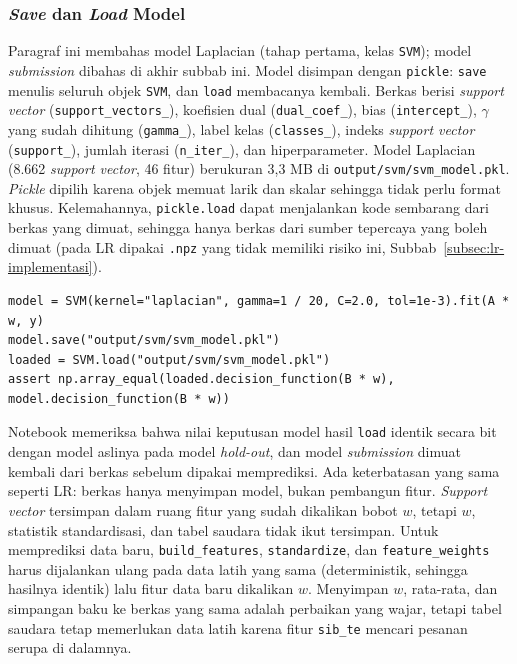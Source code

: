 \subsubsection{\textit{Save} dan \textit{Load} Model}
Paragraf ini membahas model Laplacian (tahap pertama, kelas \texttt{SVM}); model \textit{submission} dibahas di akhir subbab ini. Model disimpan dengan \texttt{pickle}: \texttt{save} menulis seluruh objek \texttt{SVM}, dan \texttt{load} membacanya kembali. Berkas berisi \textit{support vector} (\texttt{support\_vectors\_}), koefisien dual (\texttt{dual\_coef\_}), bias (\texttt{intercept\_}), $\gamma$ yang sudah dihitung (\texttt{gamma\_}), label kelas (\texttt{classes\_}), indeks \textit{support vector} (\texttt{support\_}), jumlah iterasi (\texttt{n\_iter\_}), dan hiperparameter. Model Laplacian (8.662 \textit{support vector}, 46 fitur) berukuran 3,3 MB di \nolinkurl{output/svm/svm_model.pkl}. \textit{Pickle} dipilih karena objek memuat larik dan skalar sehingga tidak perlu format khusus. Kelemahannya, \texttt{pickle.load} dapat menjalankan kode sembarang dari berkas yang dimuat, sehingga hanya berkas dari sumber tepercaya yang boleh dimuat (pada LR dipakai \texttt{.npz} yang tidak memiliki risiko ini, Subbab~\ref{subsec:lr-implementasi}).

\begin{lstlisting}[caption={Contoh penyimpanan dan pemuatan model},label={lst:svm-saveload}]
model = SVM(kernel="laplacian", gamma=1 / 20, C=2.0, tol=1e-3).fit(A * w, y)
model.save("output/svm/svm_model.pkl")
loaded = SVM.load("output/svm/svm_model.pkl")
assert np.array_equal(loaded.decision_function(B * w), model.decision_function(B * w))
\end{lstlisting}

Notebook memeriksa bahwa nilai keputusan model hasil \texttt{load} identik secara bit dengan model aslinya pada model \textit{hold-out}, dan model \textit{submission} dimuat kembali dari berkas sebelum dipakai memprediksi. Ada keterbatasan yang sama seperti LR: berkas hanya menyimpan model, bukan pembangun fitur. \textit{Support vector} tersimpan dalam ruang fitur yang sudah dikalikan bobot $w$, tetapi $w$, statistik standardisasi, dan tabel saudara tidak ikut tersimpan. Untuk memprediksi data baru, \texttt{build\_features}, \texttt{standardize}, dan \texttt{feature\_weights} harus dijalankan ulang pada data latih yang sama (deterministik, sehingga hasilnya identik) lalu fitur data baru dikalikan $w$. Menyimpan $w$, rata-rata, dan simpangan baku ke berkas yang sama adalah perbaikan yang wajar, tetapi tabel saudara tetap memerlukan data latih karena fitur \texttt{sib\_te} mencari pesanan serupa di dalamnya.

